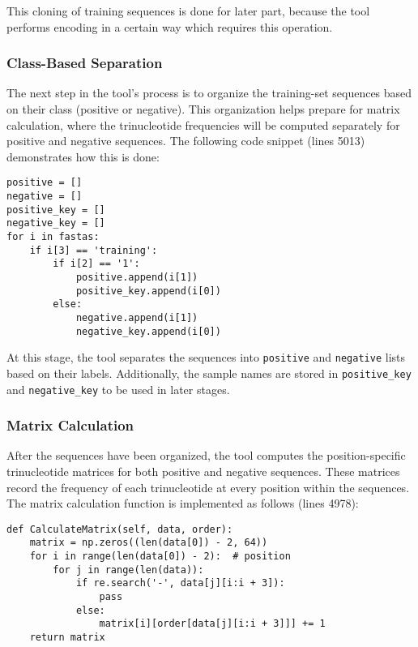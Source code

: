       This cloning of training sequences is done for later part, because the tool performs encoding in a certain way which requires this operation.

    \subsubsection*{Class-Based Separation}

      The next step in the tool's process is to organize the training-set sequences based on their class (positive or negative).
      This organization helps prepare for matrix calculation, where the trinucleotide frequencies will be computed separately for positive and negative sequences.
      The following code snippet (lines 5013) demonstrates how this is done:

      \begin{lstlisting}[caption={Organizing Sequences by Class},label={lst:organizing class}]
positive = []
negative = []
positive_key = []
negative_key = []
for i in fastas:
    if i[3] == 'training':
        if i[2] == '1':
            positive.append(i[1])
            positive_key.append(i[0])
        else:
            negative.append(i[1])
            negative_key.append(i[0])
      \end{lstlisting}

      At this stage, the tool separates the sequences into \texttt{positive} and \texttt{negative} lists based on their labels.
      Additionally, the sample names are stored in \texttt{positive\_key} and \texttt{negative\_key} to be used in later stages.

    \subsubsection*{Matrix Calculation}

      After the sequences have been organized, the tool computes the position-specific trinucleotide matrices for both positive and negative sequences.
      These matrices record the frequency of each trinucleotide at every position within the sequences.
      The matrix calculation function is implemented as follows (lines 4978):

      \begin{lstlisting}[caption={Matrix Calculation for Trinucleotides},label={lst:matrices-calculation}]
def CalculateMatrix(self, data, order):
    matrix = np.zeros((len(data[0]) - 2, 64))
    for i in range(len(data[0]) - 2):  # position
        for j in range(len(data)):
            if re.search('-', data[j][i:i + 3]):
                pass
            else:
                matrix[i][order[data[j][i:i + 3]]] += 1
    return matrix
      \end{lstlisting}

